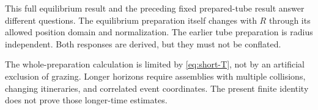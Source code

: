 This full equilibrium result and the preceding fixed prepared-tube result answer different questions. The equilibrium preparation itself changes with $R$ through its allowed position domain and normalization. The earlier tube preparation is radius independent. Both responses are derived, but they must not be conflated.

The whole-preparation calculation is limited by \eqref{eq:short-T}, not by an artificial exclusion of grazing. Longer horizons require assemblies with multiple collisions, changing itineraries, and correlated event coordinates. The present finite identity does not prove those longer-time estimates.
\par
